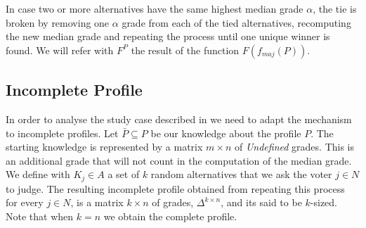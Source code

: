 \documentclass[version=3.21, pagesize, twoside=off, bibliography=totoc, DIV=calc, fontsize=12pt, a4paper]{scrartcl}
\begin{document}
In case two or more alternatives have the same highest median grade $\alpha$, the tie is broken by removing one $\alpha$ grade from each of the tied alternatives, recomputing the new median grade and repeating the process until one unique winner is found.  We will refer with $F^P$ the result of the function $F(f_{maj}(P))$. 

\subsection{Incomplete Profile}
In order to analyse the study case described in   we need to adapt the mechanism to incomplete profiles. Let $\bar{P} \subseteq P$ be our knowledge about the profile $P$. %
The starting knowledge is represented by a matrix $m\times n$ of \textit{Undefined} grades. This is an additional grade that will not count in the computation of the median grade. We define with $K_j \in A$ a set of $k$ random alternatives that we ask the voter $j\in N$ to judge. The resulting incomplete profile obtained from repeating this process for every $j \in N$, is a matrix $k \times n$ of grades, $\Delta^{k\times n}$, and its said to be $k$-sized. Note that when $k=n$ we obtain the complete profile.
\end{document}
